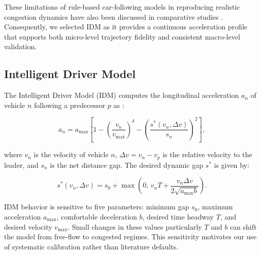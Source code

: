 \documentclass{scspaperproc}
\theoremstyle{scsthe}
\begin{document}
    These limitations of rule-based car-following models in reproducing realistic congestion dynamics have also been discussed in comparative studies \cite{treiber2015comparing}. Consequently, we selected IDM as it provides a continuous acceleration profile that supports both micro-level trajectory fidelity and consistent macro-level validation.


    \subsection{Intelligent Driver Model}

    The Intelligent Driver Model (IDM) computes the longitudinal acceleration
    $a_n$ of vehicle $n$ following a predecessor $p$ as \cite{treiber2000congested}:

    \begin{equation}
        a_n = a_{\max} \left[
                           1 - \left( \frac{v_n}{v_{\max}} \right)^\delta
                           - \left( \frac{s^*(v_n, \Delta v)}{s_n} \right)^2
        \right],
    \end{equation}

    where $v_n$ is the velocity of vehicle $n$, $\Delta v = v_n - v_p$ is the
    relative velocity to the leader, and $s_n$ is the net distance gap.
    The desired dynamic gap $s^*$ is given by:

    \begin{equation}
        s^*(v_n, \Delta v) =
        s_0 + \max\!\left(0,\, v_n T + \frac{v_n \Delta v}{2\sqrt{a_{\max} b}} \right).
    \end{equation}

    IDM behavior is sensitive to five parameters: minimum gap $s_0$, maximum acceleration $a_{\max}$, comfortable deceleration $b$, desired time headway $T$, and desired velocity $v_{\max}$. Small changes in these values particularly $T$ and $b$ can shift the model from free-flow to congested regimes. This sensitivity motivates our use of systematic calibration rather than literature defaults.
\end{document}
